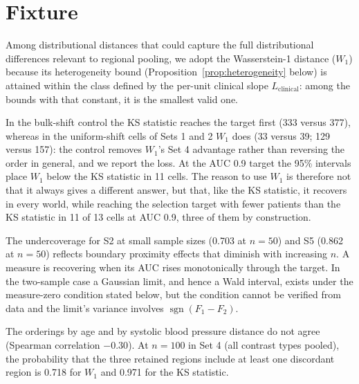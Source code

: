 \section{Fixture}
Among distributional distances that could capture the full distributional differences relevant to regional pooling, we adopt the Wasserstein-1 distance ($W_1$) because its heterogeneity bound (Proposition~\ref{prop:heterogeneity} below) is attained within the class defined by the per-unit clinical slope $L_{\text{clinical}}$: among the bounds with that constant, it is the smallest valid one.

In the bulk-shift control the KS statistic reaches the target first (333 versus 377), whereas in the uniform-shift cells of Sets 1 and 2 $W_1$ does (33 versus 39; 129 versus 157): the control removes $W_1$'s Set 4 advantage rather than reversing the order in general, and we report the loss. At the AUC 0.9 target the 95\% intervals place $W_1$ below the KS statistic in 11 cells. The reason to use $W_1$ is therefore not that it always gives a different answer, but that, like the KS statistic, it recovers in every world, while reaching the selection target with fewer patients than the KS statistic in 11 of 13 cells at AUC 0.9, three of them by construction.

The undercoverage for S2 at small sample sizes (0.703 at $n=50$) and S5 (0.862 at $n=50$) reflects boundary proximity effects that diminish with increasing $n$. A measure is recovering when its AUC rises monotonically through the target. In the two-sample case a Gaussian limit, and hence a Wald interval, exists under the measure-zero condition stated below, but the condition cannot be verified from data and the limit's variance involves $\operatorname{sgn}(F_1 - F_2)$.

The orderings by age and by systolic blood pressure distance do not agree (Spearman correlation $-0.30$). At $n = 100$ in Set 4 (all contrast types pooled), the probability that the three retained regions include at least one discordant region is 0.718 for $W_1$ and 0.971 for the KS statistic.

\caption{Forest plots. $^dagger$Distance unresolved against its null floor.}
